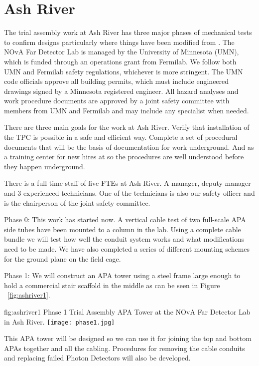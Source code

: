 \section{Ash River}

The trial assembly work at Ash River has three major phases of 
mechanical tests to confirm designs particularly where things have
been modified from .  The NOvA Far Detector Lab is managed by
the University of Minnesota (UMN), which is funded through an
operations grant from Fermilab.  We follow both UMN and Fermilab
safety regulations, whichever is more stringent.  The UMN code
officials approve all building permits, which must include engineered
drawings signed by a Minnesota registered engineer. All hazard
analyses and work procedure documents are approved by a joint safety
committee with members from UMN and Fermilab and may include any
specialist when needed.

There are three main goals for the work at Ash River. Verify that
installation of the  TPC is possible in a safe and efficient
way. Complete a set of procedural documents that will be the basis of
documentation for work underground.  And as a training center for new
hires at \surf so the procedures are well understood before they happen
underground.

There is a full time staff of five FTEs at Ash River. A manager,
deputy manager and 3 experienced technicians.  One of the technicians
is also our safety officer and is the chairperson of the joint safety
committee.


Phase 0: This work has started now.  A vertical cable test of two
full-scale APA side tubes have been mounted to a column in the
lab. Using a complete cable bundle we will test how well the conduit
system works and what modifications need to be made. We have also
completed a series of different mounting schemes for the ground plane
on the field cage.

Phase 1: We will construct an APA tower using a steel frame large
enough to hold a commercial stair scaffold in the middle as can be
seen in Figure ~\ref{fig:ashriver1}.
\begin{dunefigure}{fig:ashriver1}
  {Phase 1 Trial Assembly APA Tower at the NOvA Far Detector Lab in Ash River.}
  \texttt{[image: phase1.jpg]}
\end{dunefigure}
This APA tower will be designed so we can
use it for joining the top and bottom APAs together and all the
cabling. Procedures for removing the cable conduits and replacing
failed Photon Detectors will also be developed.

